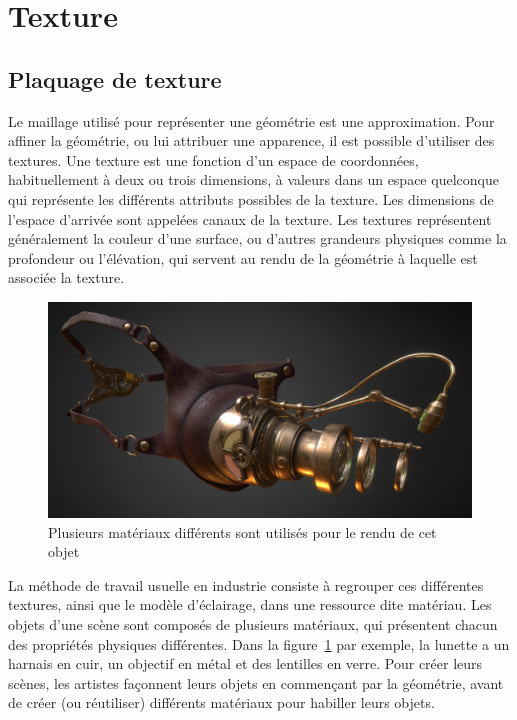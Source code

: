 \section{Texture}

\subsection{Plaquage de texture}

Le maillage utilisé pour représenter une géométrie est une approximation. Pour affiner la géométrie, ou lui attribuer une apparence, il est possible d'utiliser des textures. Une texture est une fonction d'un espace de coordonnées, habituellement à deux ou trois dimensions, à valeurs dans un espace quelconque qui représente les différents attributs possibles de la texture. Les dimensions de l'espace d'arrivée sont appelées canaux de la texture. Les textures représentent généralement la couleur d'une surface, ou d'autres grandeurs physiques comme la profondeur ou l'élévation, qui servent au rendu de la géométrie à laquelle est associée la texture.

\bigskip

\begin{figure}
    \centering
    \includegraphics[width=.65\textwidth]{contenu/resources/images/mutli-material-object}
    \caption[Rendu d'un objet comportant plusieurs matériaux]{Plusieurs matériaux différents sont utilisés pour le rendu de cet objet~\cite{lepkarepka_steampunk_2021}}
    \label{fig:multi-material}
\end{figure}

La méthode de travail usuelle en industrie consiste à regrouper ces différentes textures, ainsi que le modèle d'éclairage, dans une ressource dite matériau. Les objets d'une scène sont composés de plusieurs matériaux, qui présentent chacun des propriétés physiques différentes. Dans la figure~\ref{fig:multi-material} par exemple, la lunette a un harnais en cuir, un objectif en métal et des lentilles en verre. Pour créer leurs scènes, les artistes façonnent leurs objets en commençant par la géométrie, avant de créer (ou réutiliser) différents matériaux pour habiller leurs objets.

